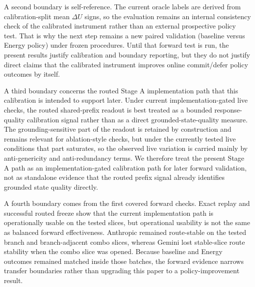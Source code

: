 \documentclass[11pt,a4paper]{article}
\begin{document}
A second boundary is self-reference. The current oracle labels are derived from calibration-split mean $\Delta U$ signs, so the evaluation remains an internal consistency check of the calibrated instrument rather than an external prospective policy test. That is why the next step remains a new paired validation (baseline versus Energy policy) under frozen procedures. Until that forward test is run, the present results justify calibration and boundary reporting, but they do not justify direct claims that the calibrated instrument improves online commit/defer policy outcomes by itself.

A third boundary concerns the routed Stage A implementation path that this calibration is intended to support later. Under current implementation-gated live checks, the routed shared-prefix readout is best treated as a bounded response-quality calibration signal rather than as a direct grounded-state-quality measure. The grounding-sensitive part of the readout is retained by construction and remains relevant for ablation-style checks, but under the currently tested live conditions that part saturates, so the observed live variation is carried mainly by anti-genericity and anti-redundancy terms. We therefore treat the present Stage A path as an implementation-gated calibration path for later forward validation, not as standalone evidence that the routed prefix signal already identifies grounded state quality directly.

A fourth boundary comes from the first covered forward checks. Exact replay and successful routed freeze show that the current implementation path is operationally usable on the tested slices, but operational usability is not the same as balanced forward effectiveness. Anthropic remained route-stable on the tested branch and branch-adjacent combo slices, whereas Gemini lost stable-slice route stability when the combo slice was opened. Because baseline and Energy outcomes remained matched inside those batches, the forward evidence narrows transfer boundaries rather than upgrading this paper to a policy-improvement result.
\end{document}
